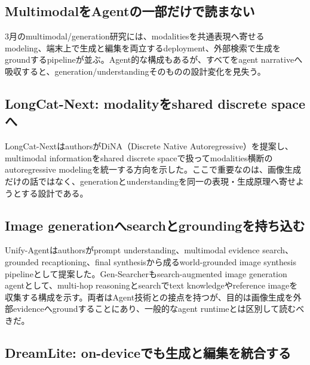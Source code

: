 \begingroup\raggedright
\subsection{MultimodalをAgentの一部だけで読まない}
\par\endgroup

3月のmultimodal/generation研究には、modalitiesを共通表現へ寄せるmodeling、端末上で生成と編集を両立するdeployment、外部検索で生成をgroundするpipelineが並ぶ。Agent的な構成もあるが、すべてをagent narrativeへ吸収すると、generation/understandingそのものの設計変化を見失う。\autocite{src-197775677c0d,src-abece2adf5a7,src-ac36472a8f09,src-b8369fd2c988}


\begingroup\raggedright
\subsection{LongCat-Next: modalityをshared discrete spaceへ}
\par\endgroup

LongCat-NextはauthorsがDiNA（Discrete Native Autoregressive）を提案し、multimodal informationをshared discrete spaceで扱ってmodalities横断のautoregressive modelingを統一する方向を示した。ここで重要なのは、画像生成だけの話ではなく、generationとunderstandingを同一の表現・生成原理へ寄せようとする設計である。\autocite{src-ac36472a8f09}


\begingroup\raggedright
\subsection{Image generationへsearchとgroundingを持ち込む}
\par\endgroup

Unify-Agentはauthorsがprompt understanding、multimodal evidence search、grounded recaptioning、final synthesisから成るworld-grounded image synthesis pipelineとして提案した。Gen-Searcherもsearch-augmented image generation agentとして、multi-hop reasoningとsearchでtext knowledgeやreference imageを収集する構成を示す。両者はAgent技術との接点を持つが、目的は画像生成を外部evidenceへgroundすることにあり、一般的なagent runtimeとは区別して読むべきだ。\autocite{src-197775677c0d,src-abece2adf5a7}


\begingroup\raggedright
\subsection{DreamLite: on-deviceでも生成と編集を統合する}
\par\endgroup

